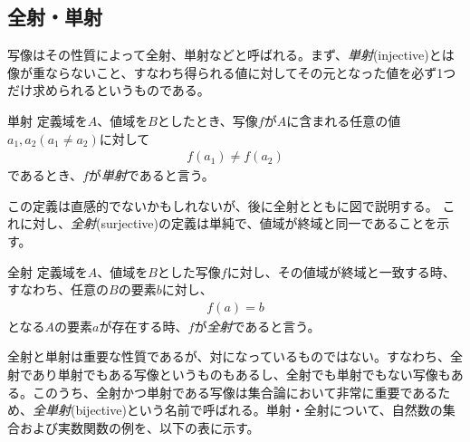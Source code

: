 \subsection{全射・単射}
写像はその性質によって全射、単射などと呼ばれる。まず、\emph{単射}(injective)とは像が重ならないこと、すなわち得られる値に対してその元となった値を必ず1つだけ求められるというものである。
\begin{definition*}{単射}
	定義域を\(A\)、値域を\(B\)としたとき、写像\(f\)が\(A\)に含まれる任意の値\(a_1,a_2(a_1\neq a_2)\)に対して
	\begin{equation}
		\begin{aligned}
			f(a_1)\neq f(a_2)
		\end{aligned}
	\end{equation}
	であるとき、\(f\)が\emph{単射}であると言う。
\end{definition*}
この定義は直感的でないかもしれないが、後に全射とともに図で説明する。
これに対し、\emph{全射}(surjective)の定義は単純で、値域が終域と同一であることを示す。
\begin{definition*}{全射}
	定義域を\(A\)、値域を\(B\)とした写像\(f\)に対し、その値域が終域と一致する時、
	すなわち、任意の\(B\)の要素\(b\)に対し、
	\begin{equation}
		\begin{aligned}
			f(a)= b
		\end{aligned}
	\end{equation}
	となる\(A\)の要素\(a\)が存在する時、\(f\)が\emph{全射}であると言う。
\end{definition*}
全射と単射は重要な性質であるが、対になっているものではない。すなわち、全射であり単射でもある写像というものもあるし、全射でも単射でもない写像もある。このうち、全射かつ単射である写像は集合論において非常に重要であるため、\emph{全単射}(bijective)という名前で呼ばれる。単射・全射について、自然数の集合および実数関数の例を、以下の表に示す。

